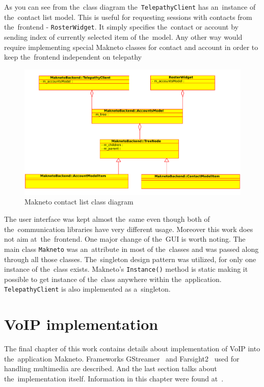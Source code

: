 As you can see from the~class diagram the~\verb|TelepathyClient| has an~instance of the~contact list model. This is useful for requesting sessions with contacts from the~frontend - \verb|RosterWidget|. It simply specifies the~contact or account by sending index of currently selected item of the~model. Any other way would require implementing special Makneto classes for contact and account in order to keep the~frontend independent on telepathy   

\begin{figure}[ht]
	\begin{center}
	\includegraphics[width=15cm]{fig/contact-list-class-diag.pdf}
	\caption{Makneto contact list class diagram}
	\label{fig:contactListClassDiag}
\end{center}
\end{figure}

The user interface was kept almost the~same even though both of the~communication libraries have very different usage. Moreover this work does not aim at~the~frontend. One major change of the~GUI is worth noting. The main class \verb|Makneto| was an~attribute in most of the~classes and was passed along through all those classes. The~singleton design pattern was utilized, for only one instance of the~class exists. Makneto's \verb|Instance()| method is static making it possible to get instance of the~class  anywhere within the~application. \verb|TelepathyClient| is also implemented as a~singleton. 


\chapter{VoIP implementation}\label{chapter:voip-implementation}
The final chapter of this work contains details about implementation of VoIP into the~application Makneto. Frameworks GStreamer~\cite{gstreamer} and Farsight2~\cite{farsight} used for handling multimedia are described. And the last section talks about the~implementation itself. Information in this chapter were found at~\cite{gstreamer, phonon, farsight}. 

